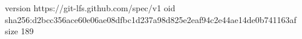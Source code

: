 version https://git-lfs.github.com/spec/v1
oid sha256:d2bcc356ace60e06ae08dfbc1d237a98d825e2eaf94c2e44ae14de0b741163af
size 189
